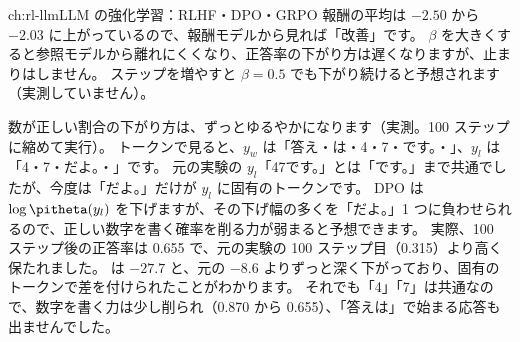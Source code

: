 \begin{answers}{ch:rl-llm}{LLM の強化学習：RLHF・DPO・GRPO}
報酬の平均は $-2.50$ から $-2.03$ に上がっているので、報酬モデルから見れば「改善」です。
$\beta$ を大きくすると参照モデルから離れにくくなり、正答率の下がり方は遅くなりますが、止まりはしません。
ステップを増やすと $\beta=0.5$ でも下がり続けると予想されます（実測していません）。
\item 数が正しい割合の下がり方は、ずっとゆるやかになります（実測。100 ステップに縮めて実行）。
トークンで見ると、$y_w$ は「答え・は・4・7・です。・」、$y_l$ は「4・7・だよ。・」です。
元の実験の $y_l$「47です。」とは「です。」まで共通でしたが、今度は「だよ。」だけが $y_l$ に固有のトークンです。
DPO は $\log\pitheta(y_l)$ を下げますが、その下げ幅の多くを「だよ。」1 つに負わせられるので、正しい数字を書く確率を削る力が弱まると予想できます。
実際、100 ステップ後の正答率は 0.655 で、元の実験の 100 ステップ目（0.315）より高く保たれました。
 は $-27.7$ と、元の $-8.6$ よりずっと深く下がっており、固有のトークンで差を付けられたことがわかります。
それでも「4」「7」は共通なので、数字を書く力は少し削られ（0.870 から 0.655）、「答えは」で始まる応答も出ませんでした。
\end{answers}
